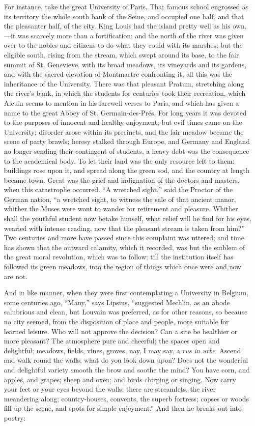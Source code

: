 For instance, take the great University of Paris. That famous
school engrossed as its territory the whole south bank of the Seine,
and occupied one half, and that the pleasanter half, of the city. King
Louis had the island pretty well as his own,—it was scarcely more
than a fortification; and the north of the river was given over to the
nobles and citizens to do what they could with its marshes; but the
eligible south, rising from the stream, which swept around its base,
to the fair summit of St. Genevieve, with its broad meadows, its
vineyards and its gardens, and with the sacred elevation of Montmartre
confronting it, all this was the inheritance of the University. There
was that pleasant Pratum, stretching along the river's bank, in which
the students for centuries took their recreation, which Alcuin seems
to mention in his farewell verses to Paris, and which has given a name
to the great Abbey of St. Germain-des-Prés. For long years it was
devoted to the purposes of innocent and healthy enjoyment; but evil
times came on the University; disorder arose within its precincts, and
the fair meadow became the scene of party brawls; heresy stalked
through Europe, and Germany and England no longer sending their
contingent of students, a heavy debt was the consequence to the
academical body. To let their land was the only resource left to them:
buildings rose upon it, and spread along the green sod, and the
country at length became town. Great was the grief and indignation of
the doctors and masters, when this catastrophe occurred. ``A
wretched sight,'' said the Proctor of the German nation, ``a
wretched sight, to witness the sale of that ancient manor, whither the
Muses were wont to wander for retirement and pleasure. Whither shall
the youthful student now betake himself, what relief will he find for
his eyes, wearied with intense reading, now that the pleasant stream
is taken from him?'' Two centuries and more have passed since this
complaint was uttered; and time has shown that the outward calamity,
which it recorded, was but the emblem of the great moral revolution,
which was to follow; till the institution itself has followed its
green meadows, into the region of things which once were and now are
not.

And in like manner, when they were first contemplating a University
in Belgium, some centuries ago, ``Many,'' says Lipsius,
``suggested Mechlin, as an abode salubrious and clean, but Louvain
was preferred, as for other reasons, so because no city seemed, from
the disposition of place and people, more suitable for learned
leisure. Who will not approve the decision? Can a site be healthier or
more pleasant? The atmosphere pure and cheerful; the spaces open and
delightful; meadows, fields, vines, groves, nay, I may say, a \emph{rus
in urbe}. Ascend and walk round the walls; what do you look down
upon? Does not the wonderful and delightful variety smooth the brow
and soothe the mind? You have corn, and apples, and grapes; sheep and
oxen; and birds chirping or singing. Now carry your feet or your eyes
beyond the walls; there are streamlets, the river meandering along;
country-houses, convents, the superb fortress; copses or woods fill up
the scene, and spots for simple enjoyment.'' And then he
breaks out into poetry:

